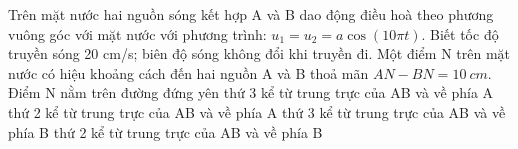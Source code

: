 \begin{vidu}%
Trên mặt nước hai nguồn sóng kết hợp A và B dao động điều hoà theo phương vuông góc với mặt nước với phương trình: $u_1=u_2=a\cos \left(10\pi t\right)$. Biết tốc độ truyền sóng 20 cm/s; biên độ sóng không đổi khi truyền đi. Một điểm N trên mặt nước có hiệu khoảng cách đến hai nguồn A và B thoả mãn $AN-BN=10\ cm$. Điểm N nằm trên đường đứng yên
\choice
{thứ 3 kể từ trung trực của AB và về phía A}
{thứ 2 kể từ trung trực của AB và về phía A}
{\True thứ 3 kể từ trung trực của AB và về phía B}
{thứ 2 kể từ trung trực của AB và về phía B}
\end{vidu} %

